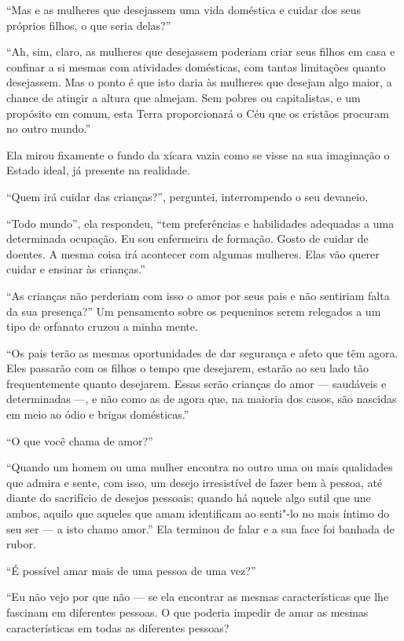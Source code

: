 ``Mas e as mulheres que desejassem uma vida doméstica e cuidar dos seus
próprios filhos, o que seria delas?''

``Ah, sim, claro, as mulheres que desejassem poderiam criar seus filhos
em casa e confinar a si mesmas com atividades domésticas, com tantas
limitações quanto desejassem. Mas o ponto é que isto daria às mulheres
que desejam algo maior, a chance de atingir a altura que almejam. Sem
pobres ou capitalistas, e um propósito em comum, esta Terra
proporcionará o Céu que os cristãos procuram no outro mundo.''

Ela mirou fixamente o fundo da xícara vazia como se visse na sua
imaginação o Estado ideal, já presente na realidade.

``Quem irá cuidar das crianças?'', perguntei, interrompendo o seu
devaneio.

``Todo mundo'', ela respondeu, ``tem preferências e habilidades
adequadas a uma determinada ocupação. Eu sou enfermeira de formação.
Gosto de cuidar de doentes. A mesma coisa irá acontecer com algumas
mulheres. Elas vão querer cuidar e ensinar às crianças.'' 

``As crianças não perderiam com isso o amor por seus pais e não
sentiriam falta da sua presença?'' Um pensamento sobre os pequeninos
serem relegados a um tipo de orfanato cruzou a minha mente.

``Os pais terão as mesmas oportunidades de dar segurança e afeto que têm
agora. Eles passarão com os filhos o tempo que desejarem, estarão ao seu
lado tão frequentemente quanto desejarem. Essas serão crianças do amor
--- saudáveis e determinadas ---, e não como as de agora que, na maioria
dos casos, são nascidas em meio ao ódio e brigas domésticas.''

``O que você chama de amor?''

``Quando um homem ou uma mulher encontra no outro uma ou mais qualidades
que admira e sente, com isso, um desejo irresistível de fazer bem à
pessoa, até diante do sacrifício de desejos pessoais; quando há aquele
algo sutil que une ambos, aquilo que aqueles que amam identificam ao
senti"-lo no mais íntimo do seu ser --- a isto chamo amor.'' Ela terminou
de falar e a sua face foi banhada de rubor.

``É possível amar mais de uma pessoa de uma vez?''

``Eu não vejo por que não --- se ela encontrar as mesmas características
que lhe fascinam em diferentes pessoas. O que poderia impedir de amar as
mesmas características em todas as diferentes pessoas?

